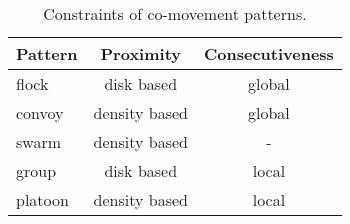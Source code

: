 \begin{table}[h]
\centering
\begin{tabular}{|l|c|c|}
\hline 
\textbf{Pattern} & {\textbf{Proximity}} & { \textbf{Consecutiveness}} \\%
\hline 
flock~\cite{gudmundsson2006computing} & disk based &  global \\%
\hline 
convoy~\cite{jeung2008discovery} & density based &   global \\%
\hline 
swarm~\cite{li2010swarm} & density based  & - \\%
\hline 
group~\cite{wang2006grouppattern} & disk based &  local \\%
\hline 
platoon~\cite{li2015platoon} & density based &  local \\%
\hline 
\end{tabular} 
\caption{Constraints of co-movement patterns.}
\label{tbl:intro-move-patterns}
\end{table}
%
%
%

